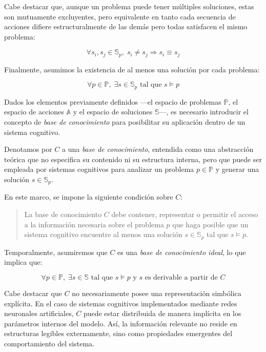 Cabe destacar que, aunque un problema puede tener múltiples soluciones, estas
son mutuamente excluyentes, pero equivalente en tanto cada secuencia de acciones
difiere
 estructuralmente de las demás pero todas satisfacen el mismo problema:

\begin{equation}
 \forall s_i, s_j \in \mathbb{S}_p,\; s_i \ne s_j \Rightarrow s_i \equiv s_j
\end{equation}

Finalmente, asumimos la existencia de al menos una solución por cada problema:


\begin{equation}
 \forall p \in \mathbb{P}, \; \exists s \in \mathbb{S} _p \text{ tal que } s
\models p
\end{equation}


Dados los elementos previamente definidos —el espacio de problemas $\mathbb{P}$,
el espacio de acciones $\mathbb{A}$ y el espacio de soluciones $\mathbb{S}$—, es
necesario introducir el concepto de \textit{base de conocimiento} para
posibilitar su aplicación dentro de un sistema cognitivo.

Denotamos por $C$ a una \textit{base de conocimiento}, entendida como una
abstracción teórica que no especifica su contenido ni su estructura interna,
pero que puede ser empleada por sistemas cognitivos para analizar un problema $p
\in \mathbb{P}$ y generar una solución $s \in \mathbb{S}_p$.

En este marco, se impone la siguiente condición sobre $C$:

\begin{quote}
 La base de conocimiento $C$ debe contener, representar o permitir
el acceso a la información necesaria sobre el problema $p$ que haga posible que
un sistema cognitivo encuentre al menos una solución $s \in \mathbb{S}_p$ tal
que $s \models p$.
 \end{quote}

Temporalmente, asumiremos que $C$ es una \textit{base de conocimiento ideal},
lo que implica que:

\begin{equation}
\forall p \in \mathbb{P}, \; \exists s \in \mathbb{S} \text{ tal que } s
\models p \text{ y } s \text{ es derivable a partir de } C
\end{equation}

Cabe destacar que $C$ no necesariamente posee una representación simbólica
explícita. En el caso de sistemas cognitivos implementados mediante redes
neuronales artificiales, $C$ puede estar distribuida de manera implícita en los
parámetros internos del modelo. Así, la información relevante no reside en
estructuras legibles externamente, sino como propiedades emergentes del
comportamiento del sistema.


